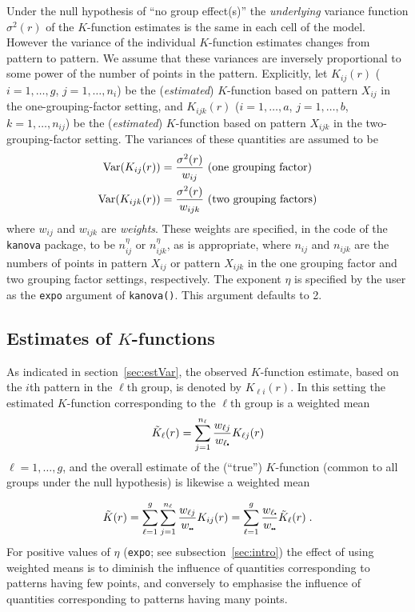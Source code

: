 \documentclass[12pt]{article}
\newcommand{\pullet}{\mbox{\scalebox{0.4}{$\bullet$}}}
\newcommand{\Var}{\mbox{$\textup{\textrm{Var}}$}}
\begin{document}
Under the null hypothesis of ``no group effect(s)'' the
\emph{underlying} variance function $\sigma^2(r)$ of the $K$-function
estimates is the same in each cell of the model.  However the
variance of the individual $K$-function estimates changes from
pattern to pattern.  We assume that these variances are inversely
proportional to some power of the number of points in the pattern.
Explicitly, let $K_{ij}(r)$ ($i=1, \ldots, g$, $j = 1, \ldots, n_i$)
be the (\emph{estimated}) $K$-function based on pattern $X_{ij}$
in the one-grouping-factor setting, and $K_{ijk}(r)$ ($i = 1,
\ldots, a$, $j = 1, \ldots, b$, $k = 1, \ldots, n_{ij}$) be the
(\emph{estimated}) $K$-function based on pattern $X_{ijk}$ in the
two-grouping-factor setting.  The variances of these quantities
are assumed to be
\begin{align*}
\Var(K_{ij}(r)) &= \frac{\sigma^2(r)}{w_{ij}} \mbox{~(one grouping factor)} \\
\Var(K_{ijk}(r)) &= \frac{\sigma^2(r)}{w_{ijk}} \mbox{~(two grouping factors)}
\end{align*}
where $w_{ij}$ and $w_{ijk}$ are \emph{weights}.  These weights are
specified, in the code of the \texttt{kanova} package, to be
$n_{ij}^{\eta}$ or $n_{ijk}^\eta$, as is appropriate, where
$n_{ij}$ and $n_{ijk}$ are the numbers of points in pattern $X_{ij}$
or pattern $X_{ijk}$ in the one grouping factor and two grouping
factor settings, respectively.  The exponent $\eta$ is specified
by the user as the \texttt{expo} argument of \texttt{kanova()}. This
argument defaults to 2.

\subsection{Estimates of $K$-functions}
\label{sec:estKfns}

As indicated in section~\ref{sec:estVar}, the observed $K$-function
estimate, based on the $i$th pattern in the $\ell$th group,
is denoted by $K_{\ell i}(r)$.  In this setting the estimated
$K$-function corresponding to the $\ell$th group is a weighted mean
\[
\tilde{K}_\ell(r) = \sum_{j=1}^{n_{\ell}}
                   \frac{w_{\ell j}}{w_{\ell \pullet}} K_{\ell j}(r)
\]
$\ell = 1, \ldots, g$, and the overall estimate of the (``true'')
$K$-function (common to all groups under the null hypothesis)
is likewise a weighted mean

\[
\tilde{K}(r) = \sum_{\ell=1}^g \sum_{j=1}^{n_{\ell}}
             \frac{w_{\ell j}}{w_{\pullet \pullet}} K_{ij}(r)
= \sum_{\ell=1}^g \frac{w_{\ell \pullet}}{w_{\pullet \pullet}} \tilde{K}_\ell(r) \;.
\]
For positive values of $\eta$ (\texttt{expo}; see
subsection~\ref{sec:intro}) the effect of using weighted means is
to diminish the influence of quantities corresponding to patterns
having few points, and conversely to emphasise the influence of
quantities corresponding to patterns having many points.
\end{document}
